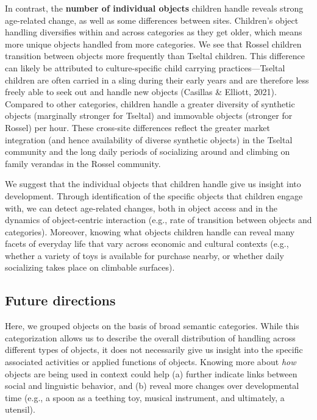 \documentclass[10pt, letterpaper]{article}
\begin{document}
In contrast, the \textbf{number of individual objects} children handle
reveals strong age-related change, as well as some differences between
sites. Children's object handling diversifies within and across
categories as they get older, which means more unique objects handled
from more categories. We see that Rossel children transition between
objects more frequently than Tseltal children. This difference can
likely be attributed to culture-specific child carrying
practices---Tseltal children are often carried in a sling during their
early years and are therefore less freely able to seek out and handle
new objects (Casillas \& Elliott, 2021). Compared to other categories,
children handle a greater diversity of synthetic objects (marginally
stronger for Tseltal) and immovable objects (stronger for Rossel) per
hour. These cross-site differences reflect the greater market
integration (and hence availability of diverse synthetic objects) in the
Tseltal community and the long daily periods of socializing around and
climbing on family verandas in the Rossel community.

We suggest that the individual objects that children handle give us
insight into development. Through identification of the specific objects
that children engage with, we can detect age-related changes, both in
object access and in the dynamics of object-centric interaction (e.g.,
rate of transition between objects and categories). Moreover, knowing
what objects children handle can reveal many facets of everyday life
that vary across economic and cultural contexts (e.g., whether a variety
of toys is available for purchase nearby, or whether daily socializing
takes place on climbable surfaces).

\hypertarget{future-directions}{%
\subsection{Future directions}\label{future-directions}}

Here, we grouped objects on the basis of broad semantic categories.
While this categorization allows us to describe the overall distribution
of handling across different types of objects, it does not necessarily
give us insight into the specific associated activities or applied
functions of objects. Knowing more about \emph{how} objects are being
used in context could help (a) further indicate links between social and
linguistic behavior, and (b) reveal more changes over developmental time
(e.g., a spoon as a teething toy, musical instrument, and ultimately, a
utensil).
\end{document}
